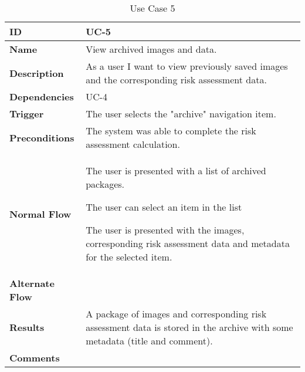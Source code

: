 \begin{table}[H]
    \begin{tabular}{ | >{\bfseries}l | p{9.5cm} |}
    \hline
    ID
    &  UC-5 \\ \hline
    Name
    & View archived images and data. \\ \hline
    Description
    &  As a user I want to view previously saved images and the corresponding risk assessment data. \\ \hline
    Dependencies
    & UC-4 \\ \hline
    Trigger
    & The user selects the "archive" navigation item. \\ \hline
    Preconditions
    & The system was able to complete the risk assessment calculation. \\ \hline
    Normal Flow
    &
    \begin{description}[align=left]
    \item [1.]The user is presented with a list of archived packages.
    \item [2.]The user can select an item in the list
    \item [3.]The user is presented with the images, corresponding risk assessment data and metadata for the selected item.
    \end{description}
    \\ \hline
    Alternate Flow
    &

    \\ \hline
    Results
    &
    A package of images and corresponding risk assessment data is stored in the archive with some metadata (title and comment).
    \\ \hline
    Comments
    &  \\ \hline
    \end{tabular}

    \caption{Use Case 5}
    \label{fig:uc_5}
\end{table}